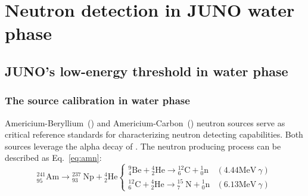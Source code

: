 \chapter{Neutron detection in JUNO water phase}
\label{chap:neutronDet}
\section{JUNO's low-energy threshold in water phase}
\label{sec:lowenergy}
\subsection{The source calibration in water phase}
Americium-Beryllium~() and Americium-Carbon~() neutron sources serve as critical reference standards for characterizing neutron detecting capabilities. Both sources leverage the alpha decay of . The neutron producing process can be described as Eq.~\eqref{eq:amn}:
\begin{equation}
	\label{eq:amn}
	{ }_{95}^{241} \mathrm{Am} \rightarrow{ }_{93}^{237} \mathrm{~Np}+{ }_2^4 \mathrm{He} \begin{cases}{ }_4^9 \mathrm{Be}+{ }_2^4 \mathrm{He} \rightarrow{ }_6^{12} \mathrm{C}+{ }_0^1 \mathrm{n} & (4.44 \mathrm{MeV}~\gamma) \\ { }_6^{12} \mathrm{C}+{ }_2^4 \mathrm{He} \rightarrow{ }_7^{15} \mathrm{~N}+{ }_0^1 \mathrm{n} & (6.13 \mathrm{MeV}~\gamma)\end{cases}
\end{equation}

